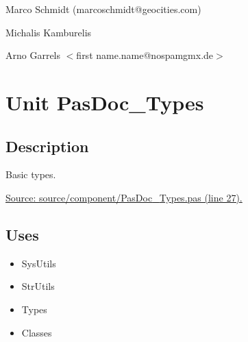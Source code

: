 \documentclass{report}
\begin{document}
\par
Marco Schmidt (marcoschmidt@geocities.com)

\par
Michalis Kamburelis

\par
Arno Garrels {$<$}first name.name@nospamgmx.de{$>$}

\chapter{Unit PasDoc{\_}Types}
\label{PasDoc_Types}
\section{Description}
Basic types.\hfill\vspace*{1ex}

   \par
\href{https://github.com/pasdoc/pasdoc/blob/master/source/component/PasDoc_Types.pas#L27}{Source: source/component/PasDoc{\_}Types.pas (line 27).}
\section{Uses}
\begin{itemize}
\item \begin{ttfamily}SysUtils\end{ttfamily}\item \begin{ttfamily}StrUtils\end{ttfamily}\item \begin{ttfamily}Types\end{ttfamily}\item \begin{ttfamily}Classes\end{ttfamily}\end{itemize}
\end{document}
